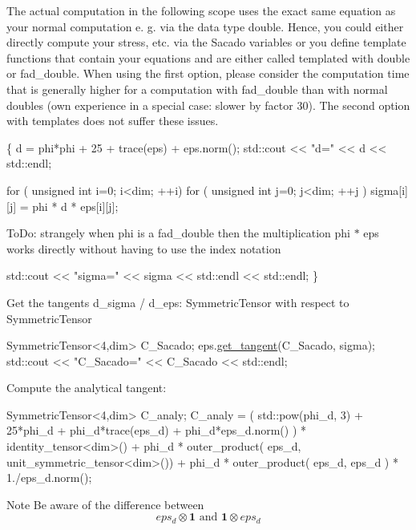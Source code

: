 The actual computation in the following scope uses the exact same equation as your normal computation e. g. via the data type double. Hence, you could either directly compute your stress, etc. via the Sacado variables or you define template functions that contain your equations and are either called templated with double or fad\+\_\+double. When using the first option, please consider the computation time that is generally higher for a computation with fad\+\_\+double than with normal doubles (own experience in a special case\+: slower by factor 30). The second option with templates does not suffer these issues. 
\begin{DoxyCode}
\{
d = phi*phi + 25 + trace(eps) + eps.norm();
std::cout << \textcolor{stringliteral}{"d="} << d << std::endl;

\textcolor{keywordflow}{for} ( \textcolor{keywordtype}{unsigned} \textcolor{keywordtype}{int} i=0; i<dim; ++i)
  \textcolor{keywordflow}{for} ( \textcolor{keywordtype}{unsigned} \textcolor{keywordtype}{int} j=0; j<dim; ++j )
      sigma[i][j] = phi * d * eps[i][j];
\end{DoxyCode}
 To\+Do\+: strangely when phi is a fad\+\_\+double then the multiplication phi $\ast$ eps works directly without having to use the index notation 
\begin{DoxyCode}
std::cout << \textcolor{stringliteral}{"sigma="} << sigma << std::endl << std::endl;
\}
\end{DoxyCode}
 Get the tangents d\+\_\+sigma / d\+\_\+eps\+: Symmetric\+Tensor with respect to Symmetric\+Tensor 
\begin{DoxyCode}
SymmetricTensor<4,dim> C\_Sacado;
eps.\hyperlink{classSacado__Wrapper_1_1SymTensor_ab97427c3b5cab279e58607cf431ab262}{get\_tangent}(C\_Sacado, sigma);
std::cout << \textcolor{stringliteral}{"C\_Sacado="} << C\_Sacado << std::endl;
\end{DoxyCode}
 Compute the analytical tangent\+: 
\begin{DoxyCode}
SymmetricTensor<4,dim> C\_analy;
C\_analy = ( std::pow(phi\_d, 3) + 25*phi\_d + phi\_d*trace(eps\_d) + phi\_d*eps\_d.norm() ) * 
      identity\_tensor<dim>()
          + phi\_d * outer\_product( eps\_d, unit\_symmetric\_tensor<dim>())
          + phi\_d * outer\_product( eps\_d, eps\_d ) * 1./eps\_d.norm();
\end{DoxyCode}
 \begin{DoxyNote}{Note}
Be aware of the difference between \[ eps_d \otimes \boldsymbol{1} \text{ and } \boldsymbol{1} \otimes eps_d \]
\end{DoxyNote}

